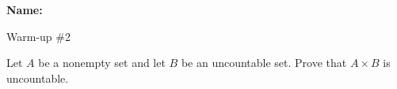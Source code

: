 \documentclass[12pt]{article}
\begin{document}
\noindent \textbf{Name:} 

\begin{center}
Warm-up \#2
\end{center}

\noindent Let $A$ be a nonempty set and let $B$ be an uncountable set. Prove that $A \times B$ is uncountable. 
\end{document}
